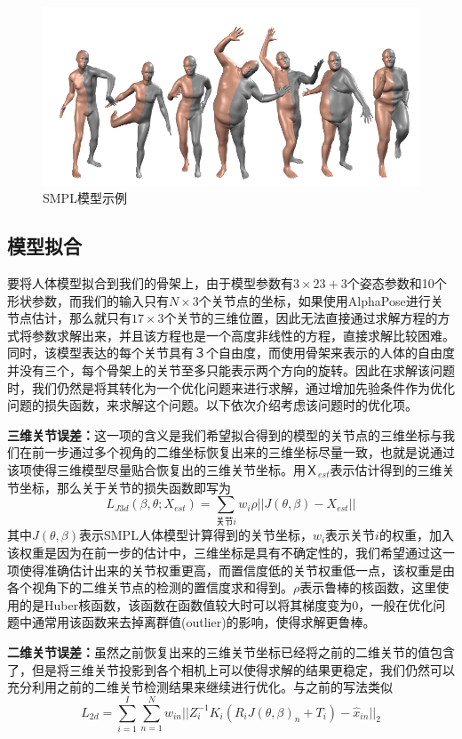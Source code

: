 \begin{figure}[htbp]
    \centering
    \includegraphics[width=0.8\linewidth]{figure/proposal/smpl}
    \caption{\label{fig:smplsample} SMPL模型示例}
\end{figure}

\subsection{模型拟合}
要将人体模型拟合到我们的骨架上，由于模型参数有\(3\times 23 + 3\)个姿态参数和10个形状参数，而我们的输入只有\(N \times 3\)个关节点的坐标，如果使用AlphaPose进行关节点估计，那么就只有\(17 \times 3\)个关节的三维位置，因此无法直接通过求解方程的方式将参数求解出来，并且该方程也是一个高度非线性的方程，直接求解比较困难。同时，该模型表达的每个关节具有３个自由度，而使用骨架来表示的人体的自由度并没有三个，每个骨架上的关节至多只能表示两个方向的旋转。因此在求解该问题时，我们仍然是将其转化为一个优化问题来进行求解，通过增加先验条件作为优化问题的损失函数，来求解这个问题。以下依次介绍考虑该问题时的优化项。

\textbf{三维关节误差：}这一项的含义是我们希望拟合得到的模型的关节点的三维坐标与我们在前一步通过多个视角的二维坐标恢复出来的三维坐标尽量一致，也就是说通过该项使得三维模型尽量贴合恢复出的三维关节坐标。用\(Ｘ_{est}\)表示估计得到的三维关节坐标，那么关于关节的损失函数即写为
\begin{equation}
    L_{J3d}(\beta, \theta; X_{est}) = \sum_{\text{关节}i}w_i\rho||J(\theta, \beta) - X_{est}||
\end{equation}
其中\(J(\theta, \beta)\)表示SMPL人体模型计算得到的关节坐标，\(w_i\)表示关节\(i\)的权重，加入该权重是因为在前一步的估计中，三维坐标是具有不确定性的，我们希望通过这一项使得准确估计出来的关节权重更高，而置信度低的关节权重低一点，该权重是由各个视角下的二维关节点的检测的置信度求和得到。\(\rho\)表示鲁棒的核函数，这里使用的是Huber核函数，该函数在函数值较大时可以将其梯度变为0，一般在优化问题中通常用该函数来去掉离群值(outlier)的影响，使得求解更鲁棒。

\textbf{二维关节误差：}虽然之前恢复出来的三维关节坐标已经将之前的二维关节的值包含了，但是将三维关节投影到各个相机上可以使得求解的结果更稳定，我们仍然可以充分利用之前的二维关节检测结果来继续进行优化。与之前的写法类似
\begin{equation}
    L_{2d} = \sum^I_{i=1} \sum_{n=1}^N w_{in}||Z_i^{-1}K_i(R_iJ(\theta, \beta)_n + T_i) - \hat x_{in}||_2
\end{equation}

